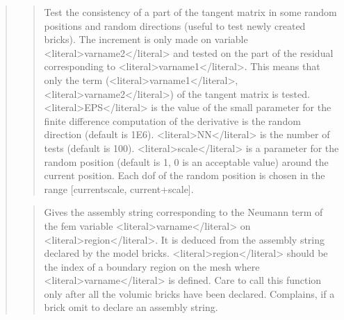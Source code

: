 \documentclass[a4paper,11pt,english]{sphinxmanual}
\begin{document}
\begin{quote}
\begin{quote}
\sphinxAtStartPar
Test the consistency of a part of the tangent matrix in some
random positions and random directions
(useful to test newly created bricks).
The increment is only made on variable \textless{}literal\textgreater{}varname2\textless{}/literal\textgreater{} and tested on the
part of the residual corresponding to \textless{}literal\textgreater{}varname1\textless{}/literal\textgreater{}. This means that
only the term (\textless{}literal\textgreater{}varname1\textless{}/literal\textgreater{}, \textless{}literal\textgreater{}varname2\textless{}/literal\textgreater{}) of the tangent matrix is tested.
\textless{}literal\textgreater{}EPS\textless{}/literal\textgreater{} is the value of the small parameter for the finite difference
computation of the derivative is the random direction (default is 1E\sphinxhyphen{}6).
\textless{}literal\textgreater{}NN\textless{}/literal\textgreater{} is the number of tests (default is 100). \textless{}literal\textgreater{}scale\textless{}/literal\textgreater{} is a parameter
for the random position (default is 1, 0 is an acceptable value)
around the current position.
Each dof of the random position is chosen in the range
{[}current\sphinxhyphen{}scale, current+scale{]}.
\end{quote}

\sphinxAtStartPar
{}
\begin{quote}

\sphinxAtStartPar
Gives the assembly string corresponding to the Neumann term of
the fem variable \textless{}literal\textgreater{}varname\textless{}/literal\textgreater{} on \textless{}literal\textgreater{}region\textless{}/literal\textgreater{}. It is deduced from the
assembly string declared by the model bricks.
\textless{}literal\textgreater{}region\textless{}/literal\textgreater{} should be the index of a boundary region
on the mesh where \textless{}literal\textgreater{}varname\textless{}/literal\textgreater{} is defined. Care to call this function
only after all the volumic bricks have been declared.
Complains, if a brick
omit to declare an assembly string.
\end{quote}

\sphinxAtStartPar
{}
\begin{quote}


\end{quote}
\end{quote}
\end{document}
